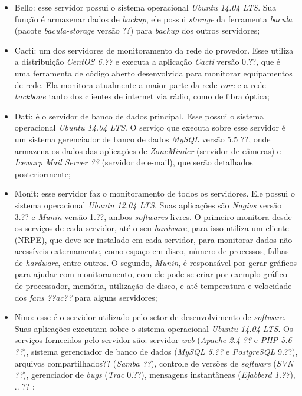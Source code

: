 \begin{itemize}
 \item Bello: esse servidor possui o sistema operacional \textit{Ubuntu 14.04 \ac{LTS}}. Sua função é armazenar dados de \textit{backup}, ele 
 possui \textit{storage} da ferramenta \textit{bacula} (pacote \textit{bacula-storage} versão ??) para \textit{backup} dos outros servidores;
 
 \item Cacti: um dos servidores de monitoramento da rede do provedor. Esse utiliza a distribuição \textit{CentOS 6.??} e executa a aplicação
 \textit{Cacti} versão 0.??, que é uma ferramenta de código aberto desenvolvida para monitorar equipamentos de rede. Ela monitora atualmente a 
 maior parte da rede \textit{core} e a rede \textit{backbone} tanto dos clientes de internet via rádio, como de fibra óptica;
 
 \item Dati: é o servidor de banco de dados principal. Esse possui o sistema operacional \textit{Ubuntu 14.04 \ac{LTS}}. O serviço que executa
 sobre esse servidor é um sistema gerenciador de banco de dados \textit{MySQL} versão 5.5 ??, onde armazena os dados das aplicações de 
 \textit{ZoneMinder} (servidor de câmeras) e \textit{Icewarp Mail Server ??} (servidor de e-mail), que serão detalhados posteriormente;
 
 \item Monit: esse servidor faz o monitoramento de todos os servidores. Ele possui o sistema operacional \textit{Ubuntu 12.04 \ac{LTS}}.
 Suas aplicações são \textit{Nagios} versão 3.?? e \textit{Munin} versão 1.??, ambos \textit{softwares} livres. O primeiro monitora desde os 
 serviços de cada servidor, até o seu \textit{hardware}, para isso utiliza um cliente (\ac{NRPE}), que deve ser instalado em cada servidor, para 
 monitorar dados não acessíveis externamente, como espaço em disco, número de processos, falhas de \textit{hardware}, entre outros. O segundo, 
 \textit{Munin}, é responsável por gerar gráficos para ajudar com monitoramento, com ele pode-se criar por exemplo gráfico de processador, 
 memória, utilização de disco, e até temperatura e velocidade dos \textit{fans ??ac??} para alguns servidores;
 
 \item Nino: esse é o servidor utilizado pelo setor de desenvolvimento de \textit{software}. Suas aplicações executam sobre o sistema operacional
 \textit{Ubuntu 14.04 \ac{LTS}}. Os serviços fornecidos pelo servidor são: servidor \textit{web} (\textit{Apache 2.4 ??} e 
 \textit{\ac{PHP} 5.6 ??}), sistema gerenciador de banco de dados (\textit{MySQL 5.??} e \textit{PostgreSQL} 9.??), arquivos compartilhados?? 
 (\textit{Samba ??}), controle de versões de \textit{software} (\textit{\ac{SVN} ??}), gerenciador de \textit{bugs} (\textit{Trac} 0.??), 
 mensagens instantâneas (\textit{Ejabberd 1.??}), .. ?? ;
 

\end{itemize}
